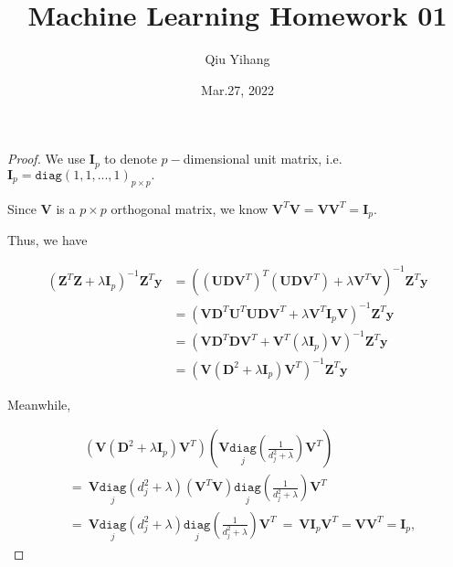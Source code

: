 \documentclass{article}
\title{\textbf{Machine Learning Homework 01}}
\author{Qiu Yihang}
\date{Mar.27, 2022}
\begin{document}
\maketitle

\begin{proof}
We use $\boldsymbol{I}_p$ to denote $p-$dimensional unit matrix, i.e. $\boldsymbol{I}_p=\mathtt{diag}(1,1,...,1)_{p\times p}.$

\hspace{1.3em}
Since $\boldsymbol{V}$ is a $p\times p$ orthogonal matrix, we know $\boldsymbol{V}^{T}\boldsymbol{V}=\boldsymbol{V}\boldsymbol{V}^T=\boldsymbol{I}_p.$

\hspace{1.3em}
Thus, we have

\vspace{-2.5em}
\begin{align*}
    \left(\boldsymbol{Z}^T\boldsymbol{Z}+\lambda \boldsymbol{I}_p\right)^{-1}\boldsymbol{Z}^T\boldsymbol{y} &= \left(\left(\boldsymbol{UD}\boldsymbol{V}^T\right)^T\left(\boldsymbol{UD}\boldsymbol{V}^T\right)+\lambda \boldsymbol{V}^T\boldsymbol{V}\right)^{-1}\boldsymbol{Z}^T\boldsymbol{y} \\
    &= \left(\boldsymbol{V}\boldsymbol{D}^T\boldsymbol{U}^T\boldsymbol{UD}\boldsymbol{V}^T+\lambda \boldsymbol{V}^T\boldsymbol{I}_p\boldsymbol{V}\right)^{-1}\boldsymbol{Z}^T\boldsymbol{y} \\
    &= \left(\boldsymbol{V}\boldsymbol{D}^T\boldsymbol{D}\boldsymbol{V}^T+\boldsymbol{V}^T\left(\lambda\boldsymbol{I}_p\right)\boldsymbol{V}\right)^{-1}\boldsymbol{Z}^T\boldsymbol{y} \\
    &= \left(\boldsymbol{V}\left(\boldsymbol{D}^2 +\lambda \boldsymbol{I}_p\right)\boldsymbol{V}^T\right)^{-1}\boldsymbol{Z}^T\boldsymbol{y} 
\end{align*}

\vspace{-1.2em} \hspace{1.3em}
Meanwhile,

\vspace{-3em}
\begin{align*}
    &\quad\ \left(\boldsymbol{V}\left(\boldsymbol{D}^2 +\lambda \boldsymbol{I}_p\right)\boldsymbol{V}^T\right)\left(\boldsymbol{V}\underset{j}{\mathtt{diag}}\left(\frac{1}{d_j^2+\lambda}\right)\boldsymbol{V}^T\right) \\
    &=\ \boldsymbol{V}\underset{j}{\mathtt{diag}}\left(d_j^2+\lambda\right)\left(\boldsymbol{V}^T\boldsymbol{V}\right)\underset{j}{\mathtt{diag}}\left(\frac{1}{d_j^2+\lambda}\right)\boldsymbol{V}^T \\
    &=\ \boldsymbol{V}\underset{j}{\mathtt{diag}}\left(d_j^2+\lambda\right)\underset{j}{\mathtt{diag}}\left(\frac{1}{d_j^2+\lambda}\right)\boldsymbol{V}^T\  =\  \boldsymbol{V}\boldsymbol{I}_p\boldsymbol{V}^T=\boldsymbol{V}\boldsymbol{V}^T=\boldsymbol{I}_p,
\end{align*}


\end{proof}
\end{document}
